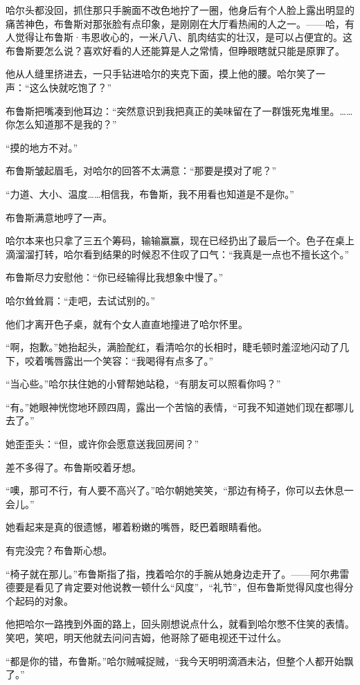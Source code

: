 \documentclass[../main]{subfiles}
\begin{document}
哈尔头都没回，抓住那只手腕面不改色地拧了一圈，他身后有个人脸上露出明显的痛苦神色，布鲁斯对那张脸有点印象，是刚刚在大厅看热闹的人之一。——哈，有人觉得让布鲁斯·韦恩收心的，一米八八、肌肉结实的壮汉，是可以占便宜的。这布鲁斯要怎么说？喜欢好看的人还能算是人之常情，但睁眼瞎就只能是原罪了。

他从人缝里挤进去，一只手钻进哈尔的夹克下面，摸上他的腰。哈尔笑了一声：“这么快就吃饱了？”

布鲁斯把嘴凑到他耳边：“突然意识到我把真正的美味留在了一群饿死鬼堆里。……你怎么知道那不是我的？”

“摸的地方不对。”

布鲁斯皱起眉毛，对哈尔的回答不太满意：“那要是摸对了呢？”

“力道、大小、温度……相信我，布鲁斯，我不用看也知道是不是你。”

布鲁斯满意地哼了一声。

哈尔本来也只拿了三五个筹码，输输赢赢，现在已经扔出了最后一个。色子在桌上滴溜溜打转，哈尔看到结果的时候忍不住叹了口气：“我真是一点也不擅长这个。”

布鲁斯尽力安慰他：“你已经输得比我想象中慢了。”

哈尔耸耸肩：“走吧，去试试别的。”

他们才离开色子桌，就有个女人直直地撞进了哈尔怀里。

“啊，抱歉。”她抬起头，满脸酡红，看清哈尔的长相时，睫毛顿时羞涩地闪动了几下，咬着嘴唇露出一个笑容：“我喝得有点多了。”

“当心些。”哈尔扶住她的小臂帮她站稳，“有朋友可以照看你吗？”

“有。”她眼神恍惚地环顾四周，露出一个苦恼的表情，“可我不知道她们现在都哪儿去了。”

她歪歪头：“但，或许你会愿意送我回房间？”

差不多得了。布鲁斯咬着牙想。

“噢，那可不行，有人要不高兴了。”哈尔朝她笑笑，“那边有椅子，你可以去休息一会儿。”

她看起来是真的很遗憾，嘟着粉嫩的嘴唇，眨巴着眼睛看他。

有完没完？布鲁斯心想。

“椅子就在那儿。”布鲁斯指了指，拽着哈尔的手腕从她身边走开了。——阿尔弗雷德要是看见了肯定要对他说教一顿什么“风度”，“礼节”，但布鲁斯觉得风度也得分个起码的对象。

他把哈尔一路拽到外面的路上，回头刚想说点什么，就看到哈尔憋不住笑的表情。笑吧，笑吧，明天他就去问问吉姆，他哥除了砸电视还干过什么。

“都是你的错，布鲁斯。”哈尔贼喊捉贼，“我今天明明滴酒未沾，但整个人都开始飘了。”
\end{document}
